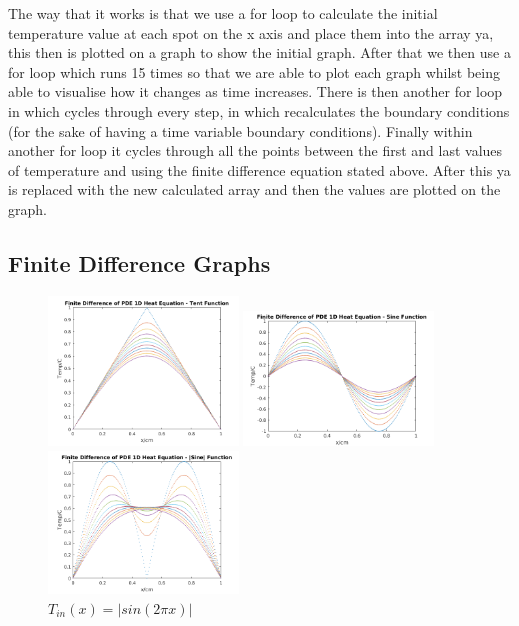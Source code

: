 \documentclass[11pt,a4paper]{article}
\begin{document}
The way that it works is that we use a for loop to calculate the initial temperature value at each spot on the x axis and place them into the array ya, this then is plotted on a graph to show the initial graph. After that we then use a for loop which runs 15 times so that we are able to plot each graph whilst being able to visualise how it changes as time increases. There is then another for loop in which cycles through every step, in which recalculates the boundary conditions (for the sake of having a time variable boundary conditions). Finally within another for loop it cycles through all the points between the first and last values of temperature and using the finite difference equation stated above. After this ya is replaced with the new calculated array and then the values are plotted on the graph.

\subsection{Finite Difference Graphs}

\begin{figure}
    \vspace{-13mm}
  		\includegraphics[width=0.45\textwidth]{Ex4_Figs/FiniteTent.png}
	\vspace{-4mm}
  	\caption{$T_{in}(x)= tent(x)$}
  		\includegraphics[width=0.45\textwidth]{Ex4_Figs/FiniteSine.png}
	\vspace{-4mm}
  	\caption{$T_{in}(x)= sin(2{\pi}x)$}
    \includegraphics[width=0.45\textwidth]{Ex4_Figs/FiniteSineabs.png}
    \vspace{-4mm}
    \caption{$T_{in}(x)= |sin(2{\pi}x)|$}
  	\label{fig:ex4g1}
\end{figure}
\end{document}
